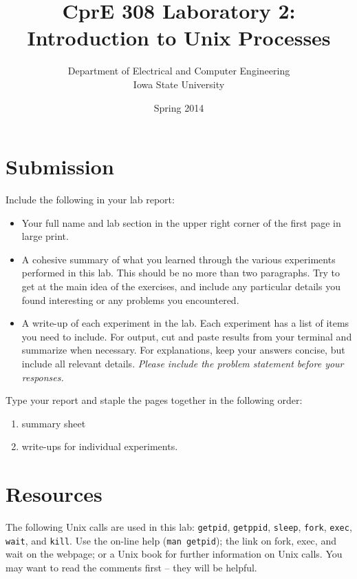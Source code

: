 \documentclass[letterpaper,10pt]{article}
\title{CprE 308 Laboratory 2: Introduction to Unix Processes}
\author{Department of Electrical and Computer Engineering \\ Iowa State University}
\date{Spring 2014}
\newcommand{\cmd}[1]{\texttt{#1}}
\begin{document}
\maketitle

\section{Submission}
Include the following in your lab report:
\begin{itemize}
 \item Your full name and lab section in the upper right corner of the first page in large print.
 \item A cohesive summary of what you learned through the various experiments performed in this
lab. This should be no more than two paragraphs. Try to get at the main idea of the
exercises, and include any particular details you found interesting or any problems you
encountered.
 \item A write-up of each experiment in the lab. Each experiment has a list of items you need to
include. For output, cut and paste results from your terminal and summarize when
necessary. For explanations, keep your answers concise, but include all relevant details.
\emph{Please include the problem statement before your responses.}
\end{itemize}

Type your report and staple the pages together in the following order:
\begin{enumerate}
 \item summary sheet
 \item write-ups for individual experiments.
\end{enumerate}

\section{Resources}
The following Unix calls are used in this lab: \cmd{getpid}, \cmd{getppid}, \cmd{sleep}, \cmd{fork}, \cmd{exec}, \cmd{wait}, and \cmd{kill}.
Use the on-line help (\cmd{man getpid}); the link on fork, exec, and wait on the webpage; or a Unix book for
further information on Unix calls. You may want to read the comments first -- they will be helpful.
\end{document}

